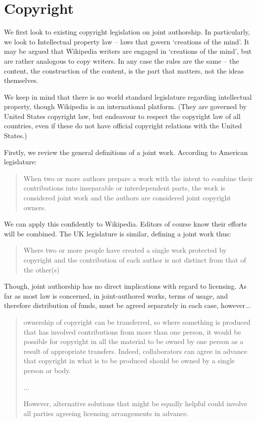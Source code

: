 \section{Copyright}
\label{sec:copyright}
We first look to existing copyright legislation on joint
authorship. In particularly, we look to Intellectual property law --
laws that govern `creations of the mind'. It may be argued that
Wikipedia writers are engaged in `creations of the mind', but are
rather analogous to copy writers. In any case the rules are the same --
the content, the construction of the content, is the part that
matters, not the ideas themselves.\cite{i-property}

We keep in mind that there is no world standard legislature regarding
intellectual property, though Wikipedia is an international
platform. (They are governed by United States copyright law, but
endeavour to respect the copyright law of all countries, even if these
do not have official copyright relations with the United States.)\cite{wiki-letter}

Firstly, we review the general definitions of a joint work. According
to American legislature:

\begin{quote}
  When two or more authors prepare a work with the intent to combine
  their contributions into inseparable or interdependent parts, the
  work is considered joint work and the authors are considered joint
  copyright owners.\cite{what-joint-authorship}
\end{quote}

We can apply this confidently to Wikipedia. Editors of course know
their efforts will be combined. The UK legislature is similar,
defining a joint work thus:

\begin{quote}
  Where two or more people have created a single work protected by
  copyright and the contribution of each author is not distinct from
  that of the other(s) \cite{joint-authorship}
\end{quote}

Though, joint authorship has no direct implications with regard to
licensing. As far as most law is concerned, in joint-authored works,
terms of usage, and therefore distribution of funds, must be agreed
separately in each case, however...

\begin{quote}
  ownership of copyright can be transferred, so where something is
  produced that has involved contributions from more than one person,
  it would be possible for copyright in all the material to be owned
  by one person as a result of appropriate transfers. Indeed,
  collaborators can agree in advance that copyright in what is to be
  produced should be owned by a single person or body. 

  ... 

  However, alternative solutions that might be equally helpful could
  involve all parties agreeing licensing arrangements in
  advance.\cite{joint-authorship}
\end{quote}

